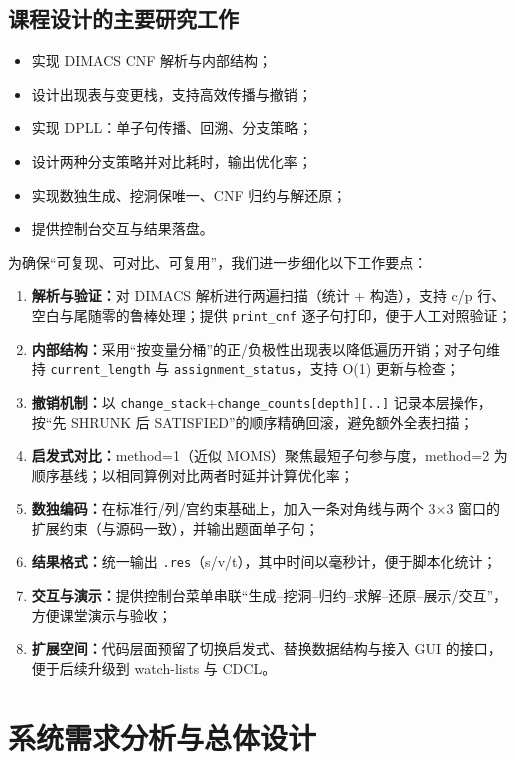 \documentclass[UTF8]{ctexart}
\begin{document}
\subsection{课程设计的主要研究工作}
\begin{itemize}
  \item 实现 DIMACS CNF 解析与内部结构；
  \item 设计出现表与变更栈，支持高效传播与撤销；
  \item 实现 DPLL：单子句传播、回溯、分支策略；
  \item 设计两种分支策略并对比耗时，输出优化率；
  \item 实现数独生成、挖洞保唯一、CNF 归约与解还原；
  \item 提供控制台交互与结果落盘。
\end{itemize}

为确保“可复现、可对比、可复用”，我们进一步细化以下工作要点：
\begin{enumerate}
  \item \textbf{解析与验证：}对 DIMACS 解析进行两遍扫描（统计 + 构造），支持 c/p 行、空白与尾随零的鲁棒处理；提供 \texttt{print\_cnf} 逐子句打印，便于人工对照验证；
  \item \textbf{内部结构：}采用“按变量分桶”的正/负极性出现表以降低遍历开销；对子句维持 \texttt{current\_length} 与 \texttt{assignment\_status}，支持 O(1) 更新与检查；
  \item \textbf{撤销机制：}以 \texttt{change\_stack}+\texttt{change\_counts[depth][..]} 记录本层操作，按“先 SHRUNK 后 SATISFIED”的顺序精确回滚，避免额外全表扫描；
  \item \textbf{启发式对比：}method=1（近似 MOMS）聚焦最短子句参与度，method=2 为顺序基线；以相同算例对比两者时延并计算优化率；
  \item \textbf{数独编码：}在标准行/列/宫约束基础上，加入一条对角线与两个 3\(\times\)3 窗口的扩展约束（与源码一致），并输出题面单子句；
  \item \textbf{结果格式：}统一输出 \texttt{.res}（s/v/t），其中时间以毫秒计，便于脚本化统计；
  \item \textbf{交互与演示：}提供控制台菜单串联“生成--挖洞--归约--求解--还原--展示/交互”，方便课堂演示与验收；
  \item \textbf{扩展空间：}代码层面预留了切换启发式、替换数据结构与接入 GUI 的接口，便于后续升级到 watch-lists 与 CDCL。
\end{enumerate}

\section{系统需求分析与总体设计}
\end{document}
